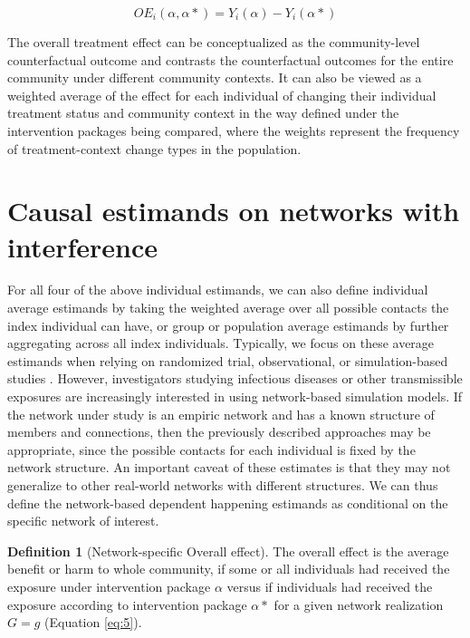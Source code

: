 \documentclass{article}
\theoremstyle{definition}
\newtheorem{definition}{Definition}[section]
\begin{document}
\begin{equation}\label{eq:4}
   OE_{i}\left(\alpha,\alpha*\right) = Y_{i}\left(\alpha\right) - Y_{i}\left(\alpha*\right)	
\end{equation}

The overall treatment effect can be conceptualized as the community-level counterfactual outcome and contrasts the counterfactual outcomes for the entire community under different community contexts. It can also be viewed as a weighted average of the effect for each individual of changing their individual treatment status and community context in the way defined under the intervention packages being compared, where the weights represent the frequency of treatment-context change types in the population. 


\section{Causal estimands on networks with interference}
For all four of the above individual estimands, we can also define individual average estimands by taking the weighted average over all possible contacts the index individual can have, or group or population average estimands by further aggregating across all index individuals. Typically, we focus on these average estimands when relying on randomized trial, observational, or simulation-based studies \cite{halloran_dependent_2016, murray_emulating_2021, buchanan_disseminated_2021}.
However, investigators studying infectious diseases or other transmissible exposures are increasingly interested in using network-based simulation models. If the network under study is an empiric network and has a known structure of members and connections, then the previously described approaches may be appropriate, since the possible contacts for each individual is fixed by the network structure. An important caveat of these estimates is that they may not generalize to other real-world networks with different structures. We can thus define the network-based dependent happening estimands as conditional on the specific network of interest. 

\begin{definition}[Network-specific Overall effect] The overall effect is the average benefit or harm to whole community, if some or all individuals had received the exposure under intervention package $\alpha$ versus if individuals had received the exposure according to intervention package $\alpha*$ for a given network realization $G=g$ (Equation \ref{eq:5}).
\end{definition}
\end{document}
